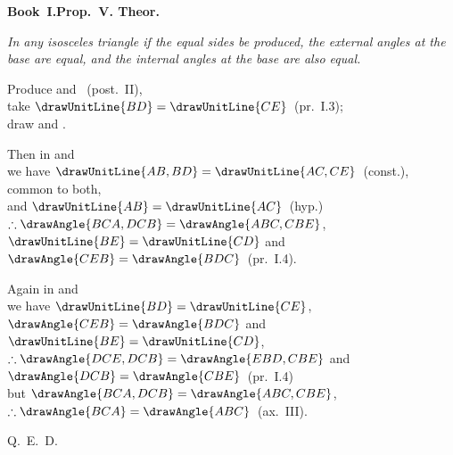 \documentclass[12pt]{article}
\begin{document}
\noindent
\begin{minipage}[t]{0.45\linewidth}
\centering\vspace{0pt}%
\drawCurrentPicture
\end{minipage}\hfill
\begin{minipage}[t]{0.52\linewidth}
\vspace{0pt}%
\textbf{Book~I.\enspace Prop.\ V. Theor.}

\medskip\noindent\itshape
In any isosceles triangle 
if the equal sides be produced, the external angles at the
base are equal, and the internal angles at the base are
also equal.

\bigskip

\noindent\upshape
Produce  and ~(post.~II),\\
take $\drawUnitLine{BD} = \drawUnitLine{CE}$~(pr.~I.3);\\
draw  and .

\medskip
Then in
 and
\\
we have $\drawUnitLine{AB,BD} = \drawUnitLine{AC,CE}$~(const.),\\
 common to both,\\
and $\drawUnitLine{AB} = \drawUnitLine{AC}$~(hyp.)\\
$\therefore \drawAngle{BCA,DCB} = \drawAngle{ABC,CBE}$,
$\drawUnitLine{BE} = \drawUnitLine{CD}$
and $\drawAngle{CEB} = \drawAngle{BDC}$~(pr.~I.4).

\medskip
Again in  and \\
we have $\drawUnitLine{BD} = \drawUnitLine{CE}$,
$\drawAngle{CEB} = \drawAngle{BDC}$
and $\drawUnitLine{BE} = \drawUnitLine{CD}$,\\
$\therefore \drawAngle{DCE,DCB} = \drawAngle{EBD,CBE}$
and $\drawAngle{DCB} = \drawAngle{CBE}$~(pr.~I.4)\\
but $\drawAngle{BCA,DCB} = \drawAngle{ABC,CBE}$,
$\therefore \drawAngle{BCA} = \drawAngle{ABC}$~(ax.~III).

\begin{flushright}Q.\ E.\ D.\end{flushright}
\end{minipage}
\end{document}
